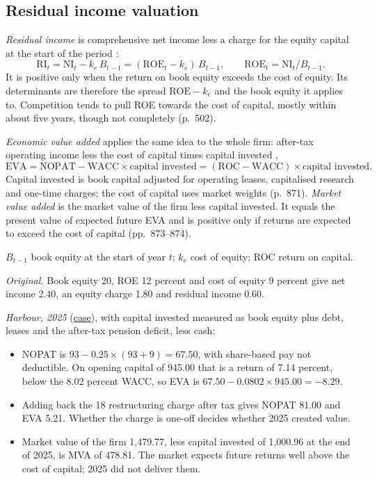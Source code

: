\subsection{Residual income valuation}

\begin{qfdefinition}\label{def:residual-income-eva}
 \emph{Residual income} is comprehensive net income less a charge for the equity capital at the start of the period \citep[pp.~42, 499, 502]{financial-statement-analysis-2009}:
\[ \mathrm{RI}_t=\mathrm{NI}_t-k_e\,B_{t-1}=(\mathrm{ROE}_t-k_e)\,B_{t-1},\qquad \mathrm{ROE}_t=\mathrm{NI}_t/B_{t-1}. \]
It is positive only when the return on book equity exceeds the cost of equity. Its determinants are therefore the spread $\mathrm{ROE}-k_e$ and the book equity it applies to. Competition tends to pull ROE towards the cost of capital, mostly within about five years, though not completely (p.~502).

\emph{Economic value added} applies the same idea to the whole firm: after-tax operating income less the cost of capital times capital invested \citep[pp.~870--871]{investment-valuation-2012},
\[ \mathrm{EVA}=\mathrm{NOPAT}-\mathrm{WACC}\times\text{capital invested}=(\mathrm{ROC}-\mathrm{WACC})\times\text{capital invested}. \]
Capital invested is book capital adjusted for operating leases, capitalised research and one-time charges; the cost of capital uses market weights (p.~871). \emph{Market value added} is the market value of the firm less capital invested. It equals the present value of expected future EVA and is positive only if returns are expected to exceed the cost of capital (pp.~873--874).

 $B_{t-1}$ book equity at the start of year $t$; $k_e$ cost of equity; ROC return on capital.

 \emph{Original.} Book equity 20, ROE 12 percent and cost of equity 9 percent give net income 2.40, an equity charge 1.80 and residual income 0.60.

\emph{Harbour, 2025} (\hyperref[ex:harbour-tools-statements]{case}), with capital invested measured as book equity plus debt, leases and the after-tax pension deficit, less cash:
\begin{itemize}
\item NOPAT is $93-0.25\times(93+9)=67.50$, with share-based pay not deductible. On opening capital of 945.00 that is a return of 7.14 percent, below the 8.02 percent WACC, so EVA is $67.50-0.0802\times945.00=-8.29$.
\item Adding back the 18 restructuring charge after tax gives NOPAT 81.00 and EVA 5.21. Whether the charge is one-off decides whether 2025 created value.
\item Market value of the firm 1,479.77, less capital invested of 1,000.96 at the end of 2025, is MVA of 478.81. The market expects future returns well above the cost of capital; 2025 did not deliver them.
\end{itemize}


\end{qfdefinition}
